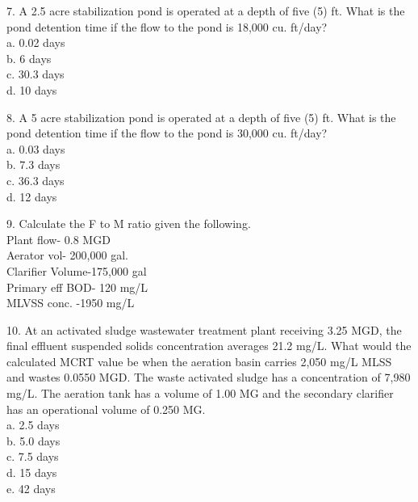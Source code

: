 7. A 2.5 acre stabilization pond is operated at a depth of five (5) ft. What is the pond detention time if the flow to the pond is 18,000 cu. ft/day?\\

\vspace{0.3cm}
a. 0.02 days \\
b. 6 days\\ 
c. 30.3 days \\
d. 10 days \\

\vspace{0.3cm}

8. A 5 acre stabilization pond is operated at a depth of five (5) ft. What is the pond detention time if the flow to the pond is 30,000 cu. ft/day?\\

\vspace{0.3cm}
a. 0.03 days \\
b. 7.3 days\\ 
c. 36.3 days \\
d. 12 days\\ 

\vspace{0.3cm}

9. Calculate the F to M ratio given the following.\\
Plant flow- 0.8 MGD\\
Aerator vol- 200,000 gal.\\
Clarifier Volume-175,000 gal\\
Primary eff BOD- 120 mg/L\\
MLVSS conc. -1950 mg/L\\


\vspace{0.3cm}


\vspace{0.3cm}
10. At an activated sludge wastewater treatment plant receiving 3.25 MGD, the final effluent suspended solids concentration averages 21.2 mg/L. What would the calculated MCRT value be when the aeration basin carries 2,050 mg/L MLSS and wastes 0.0550 MGD. The waste activated sludge has a concentration of 7,980 mg/L. The aeration tank has a volume of 1.00 MG and the secondary clarifier has an operational volume of 0.250 MG.\\

\vspace{0.3cm}
a. 2.5 days \\
b. 5.0 days\\ 
c. 7.5 days \\
d. 15 days \\
e. 42 days \\

